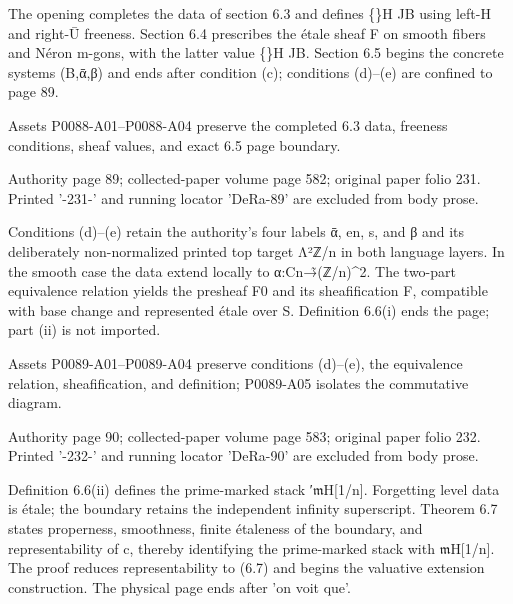 \documentclass[11pt,a4paper]{article}
\begin{document}
The opening completes the data of section 6.3 and defines \{\}\textunderscore{}H J\textunderscore{}B using left-H and right-Ū freeness. Section 6.4 prescribes the étale sheaf F on smooth fibers and Néron m-gons, with the latter value \{\}\textunderscore{}H J\textunderscore{}B. Section 6.5 begins the concrete systems (B,ᾱ,β) and ends after condition (c); conditions (d)--(e) are confined to page 89.

Assets P0088-A01--P0088-A04 preserve the completed 6.3 data, freeness conditions, sheaf values, and exact 6.5 page boundary.


\par\medskip
\hypertarget{D018-P0089}{}
\par\smallskip
Authority page 89; collected-paper volume page 582; original paper folio 231. Printed '-231-' and running locator 'DeRa-89' are excluded from body prose.

Conditions (d)--(e) retain the authority's four labels ᾱ, e\textunderscore{}n, s, and β and its deliberately non-normalized printed top target Λ²ℤ/n in both language layers. In the smooth case the data extend locally to α:C\textunderscore{}n→̃(ℤ/n)\textasciicircum{}2. The two-part equivalence relation yields the presheaf F\textunderscore{}0 and its sheafification F, compatible with base change and represented étale over S. Definition 6.6(i) ends the page; part (ii) is not imported.

Assets P0089-A01--P0089-A04 preserve conditions (d)--(e), the equivalence relation, sheafification, and definition; P0089-A05 isolates the commutative diagram.


\par\medskip
\hypertarget{D018-P0090}{}
\par\smallskip
Authority page 90; collected-paper volume page 583; original paper folio 232. Printed '-232-' and running locator 'DeRa-90' are excluded from body prose.

Definition 6.6(ii) defines the prime-marked stack ′\ensuremath{\mathfrak{m}}\textunderscore{}H[1/n]. Forgetting level data is étale; the boundary retains the independent infinity superscript. Theorem 6.7 states properness, smoothness, finite étaleness of the boundary, and representability of c, thereby identifying the prime-marked stack with \ensuremath{\mathfrak{m}}\textunderscore{}H[1/n]. The proof reduces representability to (6.7) and begins the valuative extension construction. The physical page ends after 'on voit que'.
\end{document}
